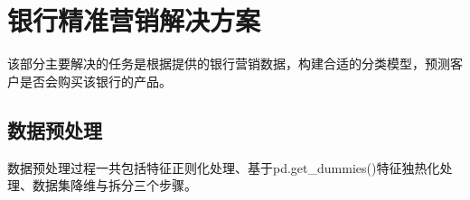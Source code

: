 \documentclass{acm_proc_article-sp}
\begin{document}
\maketitle






\section{\textsf{银行精准营销解决方案}}
该部分主要解决的任务是根据提供的银行营销数据，构建合适的分类模型，预测客户是否会购买该银行的产品。


\subsection{\textsf{数据预处理}}
数据预处理过程一共包括特征正则化处理、基于pd.get\_dummies()特征独热化处理、数据集降维与拆分三个步骤。
\end{document}

